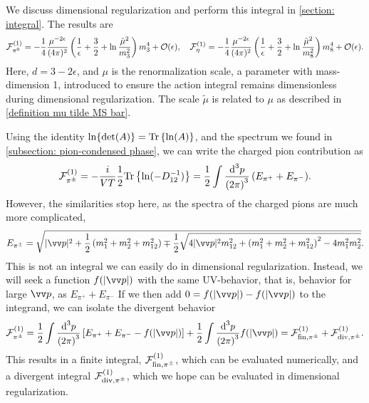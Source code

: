 We discuss dimensional regularization and perform this integral in \autoref{section: integral}.
The results are
%
\begin{equation}
    \label{Free energy pi 0}
    \mathcal{F}^{(1)}_{\pi^0} 
    = 
    -  \frac{1}{4} \frac{ \mu^{-2 \epsilon}}{(4\pi)^2}
    \left( \frac{1}{\epsilon} + \frac{3}{2} + \ln \frac{\tilde \mu^2}{m_3^2} \right)
    m_3^4
    + \mathcal{O}(\epsilon), \quad
    \mathcal{F}^{(1)}_{\eta}
    = 
    - \frac{1}{4} \frac{\mu^{-2 \epsilon}}{(4\pi)^2} 
    \left( \frac{1}{\epsilon} + \frac{3}{2} + \ln \frac{\tilde \mu^2}{m_8^2} \right)
    m_8^4
    + \mathcal{O}(\epsilon).
\end{equation}
%
Here, $d = 3 - 2\epsilon$, and $\mu$ is the renormalization scale, a parameter with mass-dimension 1, introduced to ensure the action integral remains dimensionless during dimensional regularization. The scale $\tilde \mu$ is related to $\mu$ as described in \autoref{definition mu tilde MS bar}.

Using the identity $\ln\{\det(A)\} = \text{Tr} \left\{ \ln(A) \right\}$, and the spectrum we found in \autoref{subsection: pion-condensed phase}, we can write the charged pion contribution as
%
\begin{equation}
    \mathcal{F}_{\pi^\pm}^{(1)}
    = - \frac{i}{VT}\frac{1}{2}\text{Tr} \left\{ \ln(-D_{12}^{-1}) \right\}
    =
    \frac{1}{2} \int  \frac{\text{d}^3 p}{{(2\pi)}^3 } \, (E_{\pi^+} + E_{\pi^-}).
\end{equation}
%
However, the similarities stop here, as the spectra of the charged pions are much more complicated,
%
\begin{equation}
    E_{\pi^\pm}
    = 
    \sqrt{
        |\vv p|^2 +
        \frac{1}{2}
        \left(
            m_1^2 + m_2^2 + m_{12}^2 
        \right)
        \mp 
        \frac{1}{2}
        \sqrt{
            4|\vv p|^2m_{12}^2 
            +
            \left(
                m_1^2 + m_2^2 + m_{12}^2
            \right)^2
            - 4 m_1^2 m_2^2
        }
    }.
\end{equation}
%
This is not an integral we can easily do in dimensional regularization.
Instead, we will seek a function $f(|\vv p|)$ with the same UV-behavior, that is, behavior for large $\vv p$, as $E_{\pi^+} + E_{\pi^-}$
If we then add $0 = f(|\vv p|) - f(|\vv p|)$ to the integrand, we can isolate the divergent behavior
%
\begin{equation}
    \Eff_{\pi^\pm}^{(1)}
    = 
    \frac{1}{2} \int \frac{\dd^3 p}{{(2\pi)}^3} 
    \left[E_{\pi^+} + E_{\pi^- } - f(|\vv p|)\right]
    + \frac{1}{2} \int \frac{\dd^3 p}{{(2\pi)}^3} f(|\vv p|)
    = \Eff^{(1)}_{\mathrm{fin}, \pipm } + \Eff^{(1)}_{\mathrm{div}, \pipm}.
\end{equation}
%
This results in a finite integral, $\mathcal{F}^{(1)}_{\mathrm{fin}, {\pi^\pm} }$, which can be evaluated numerically, and a divergent integral $\mathcal{F}^{(1)}_{\mathrm{div}, {\pi^\pm} }$, which we hope can be evaluated in dimensional regularization.

